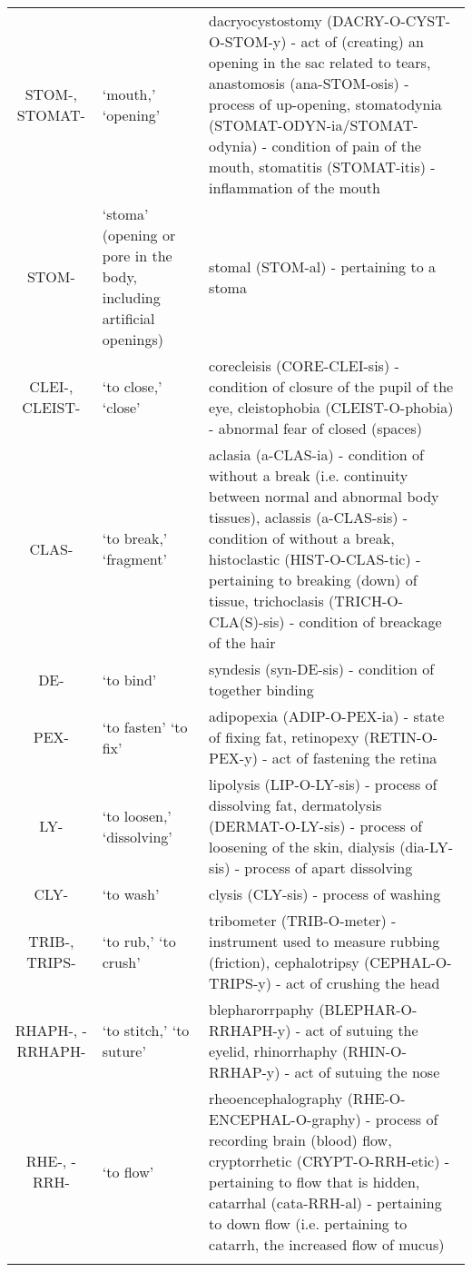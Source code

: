 \begin{longtable}{c | p{} | p{}}
        STOM-, STOMAT- & `mouth,' `opening' & dacryocystostomy (DACRY-O-CYST-O-STOM-y) - act of (creating) an opening in the sac related to tears, anastomosis (ana-STOM-osis) - process of up-opening, stomatodynia (STOMAT-ODYN-ia/STOMAT-odynia) - condition of pain of the mouth, stomatitis (STOMAT-itis) - inflammation of the mouth \\
        STOM- & `stoma' (opening or pore in the body, including artificial openings) & stomal (STOM-al) - pertaining to a stoma \\
        CLEI-, CLEIST- & `to close,' `close' & corecleisis (CORE-CLEI-sis) - condition of closure of the pupil of the eye, cleistophobia (CLEIST-O-phobia) - abnormal fear of closed (spaces) \\
        CLAS- & `to break,' `fragment' & aclasia (a-CLAS-ia) - condition of without a break (i.e. continuity between normal and abnormal body tissues), aclassis (a-CLAS-sis) - condition of without a break, histoclastic (HIST-O-CLAS-tic) - pertaining to breaking (down) of tissue, trichoclasis (TRICH-O-CLA(S)-sis) - condition of breackage of the hair \\
        DE- & `to bind' & syndesis (syn-DE-sis) - condition of together binding \\
        PEX- & `to fasten' `to fix' & adipopexia (ADIP-O-PEX-ia) - state of fixing fat, retinopexy (RETIN-O-PEX-y) - act of fastening the retina \\
        LY- & `to loosen,' `dissolving' & lipolysis (LIP-O-LY-sis) - process of dissolving fat, dermatolysis (DERMAT-O-LY-sis) - process of loosening of the skin, dialysis (dia-LY-sis) - process of apart dissolving \\
        CLY- & `to wash' & clysis (CLY-sis) - process of washing \\
        TRIB-, TRIPS- & `to rub,' `to crush' & tribometer (TRIB-O-meter) - instrument used to measure rubbing (friction), cephalotripsy (CEPHAL-O-TRIPS-y) - act of crushing the head \\
        RHAPH-, -RRHAPH- & `to stitch,' `to suture' & blepharorrpaphy (BLEPHAR-O-RRHAPH-y) - act of sutuing the eyelid, rhinorrhaphy (RHIN-O-RRHAP-y) - act of sutuing the nose \\
        RHE-, -RRH- & `to flow' & rheoencephalography (RHE-O-ENCEPHAL-O-graphy) - process of recording brain (blood) flow, cryptorrhetic (CRYPT-O-RRH-etic) - pertaining to flow that is hidden, catarrhal (cata-RRH-al) - pertaining to down flow (i.e. pertaining to catarrh, the increased flow of mucus) \\
    \label{tab:Ch7Base}
\end{longtable}



